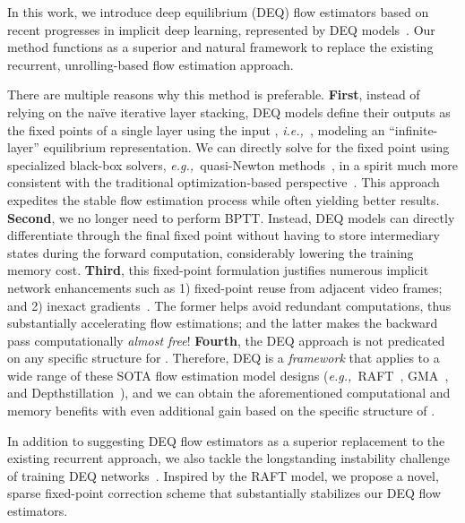 \documentclass[10pt,twocolumn,letterpaper]{article}
\def\ie{\textit{i.e.,~}}
\def\eg{\textit{e.g.,~}}
\begin{document}
In this work, we introduce deep equilibrium (DEQ) flow estimators based on recent progresses in implicit deep learning, represented by DEQ models~\cite{DEQ,MDEQ,MON,kawaguchi2020theory,Kolter2020}. 
Our method functions as a superior and natural framework to replace the existing recurrent, unrolling-based flow estimation approach. 

There are multiple reasons why this method is preferable.
\textbf{First}, instead of relying on the na\"ive iterative layer stacking, DEQ models define their outputs as the fixed points of a single layer  using the input , \ie , modeling an ``infinite-layer'' equilibrium representation. We can directly solve for the fixed point using specialized black-box solvers, \eg quasi-Newton methods~\cite{broyden1965class,anderson1965}, in a spirit much more consistent with the traditional optimization-based perspective~\cite{fleet2006optical,horn1981determining}. This approach expedites the stable flow estimation process while often yielding better results.
\textbf{Second}, we no longer need to perform BPTT. Instead, DEQ models can directly differentiate through the final fixed point  without having to store intermediary states during the forward computation, considerably lowering the training memory cost.
\textbf{Third}, this fixed-point formulation justifies numerous implicit network enhancements such as 1) fixed-point reuse from adjacent video frames; and 2) inexact gradients~\cite{Ham,SamyFPN,PhantomGrad}. The former helps avoid redundant computations, thus substantially accelerating flow estimations; and the latter makes the backward pass computationally \emph{almost free}!
\textbf{Fourth}, the DEQ approach is not predicated on any specific structure for . Therefore, DEQ is a \emph{framework} that applies to a wide range of these SOTA flow estimation model designs (\eg RAFT~\cite{RAFT}, GMA~\cite{GMA}, and Depthstillation~\cite{aleotti2021learning}), and we can obtain the aforementioned computational and memory benefits with even additional gain based on the specific structure of .

In addition to suggesting DEQ flow estimators as a superior replacement to the existing recurrent approach, we also tackle the longstanding instability challenge of training DEQ networks~\cite{chen2018neural,DEQ,DEQ_JR,MON}. Inspired by the RAFT model, we propose a novel, sparse fixed-point correction scheme that substantially stabilizes our DEQ flow estimators.
\end{document}
